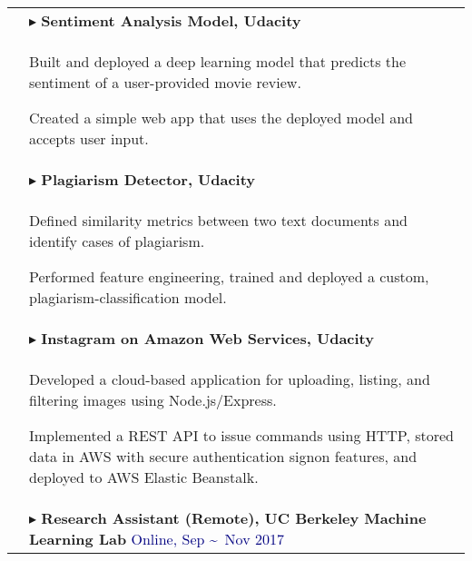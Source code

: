\documentclass[$if(fontsize)$$fontsize$,$endif$$if(lang)$$babel-lang$,$endif$$if(papersize)$$papersize$paper,$endif$$for(classoption)$$classoption$$sep$,$endfor$]{$documentclass$}
\renewenvironment{itemize}{
  \begin{list}{}{
    \setlength{\leftmargin}{1em}  %
  }
}{
  \end{list}
}
\begin{document}
\begin{tabular}{>{\centering}p{2.5cm}|p{16.5cm}}
    \midrule
    \multirow{14}{*}{\parbox{2.5cm}{\centering\small\textbf{RESEARCH PROJECTS}}}
    & \(\blacktriangleright\) \textbf{Sentiment Analysis Model, Udacity} \\
    & \vspace{-2mm}
      \begin{itemize}
        \item[\textbullet] Built and deployed a deep learning model that predicts the sentiment of a user-provided movie review.
        \item[\textbullet] Created a simple web app that uses the deployed model and accepts user input.
      \vspace{-4mm}
      \end{itemize}\\
    & \vspace{-3mm}
    \(\blacktriangleright\) \textbf{Plagiarism Detector, Udacity} \\
    & \vspace{-2mm}
      \begin{itemize}
        \item[\textbullet] Defined similarity metrics between two text documents and identify cases of plagiarism.
        \item[\textbullet] Performed feature engineering, trained and deployed a custom, plagiarism-classification model.
      \vspace{-4mm}
      \end{itemize}\\
    & \vspace{-3mm}
    \(\blacktriangleright\) \textbf{Instagram on Amazon Web Services, Udacity} \\
    & \vspace{-2mm}
      \begin{itemize}
        \item[\textbullet] Developed a cloud-based application for uploading, listing, and filtering images using Node.js/Express.
        \item[\textbullet] Implemented a REST API to issue commands using HTTP, stored data in AWS with secure authentication signon features, and deployed to AWS Elastic Beanstalk.
      \vspace{-4mm}
      \end{itemize}\\
    & \vspace{-3mm}
    \(\blacktriangleright\) \textbf{Research Assistant (Remote), UC Berkeley Machine Learning Lab} \hfill \textcolor{Navy}{Online, Sep \textasciitilde\ Nov 2017}\\

\end{tabular}
\end{document}
